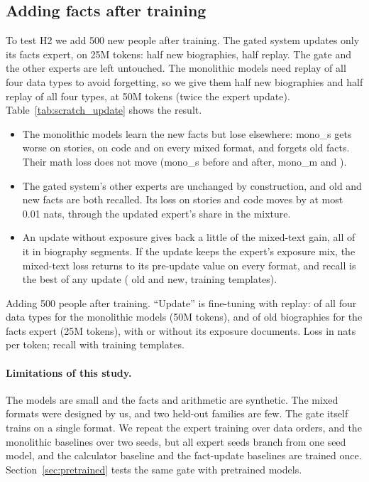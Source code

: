 \documentclass[10pt]{article}
\newcommand{\pending}[1]{{\color{red}\textbf{[#1]}}}
\begin{document}
\subsection{Adding facts after training}
\label{sec:scratch_update}

To test H2 we add 500 new people after training. The gated system updates only its facts
expert, on 25M tokens: half new biographies, half replay. The gate and the other experts are left
untouched. The monolithic models need replay of all four data types to avoid forgetting, so we
give them half new biographies and half replay of all four types, at 50M tokens (twice the
expert update). Table~\ref{tab:scratch_update} shows the result.
\begin{itemize}
\item The monolithic models learn the new facts but lose elsewhere: mono\_s gets worse
on stories, on code and on every mixed format, and forgets old facts. Their math loss does not
move (mono\_s \resTrackCUpdMonoSMathBefore{} before and \resTrackCUpdMonoSMathAfter{} after,
mono\_m \resTrackCUpdMonoMMathBefore{} and \resTrackCUpdMonoMMathAfter{}).
\item The gated system's other experts are unchanged by construction, and old and new facts are
both recalled. Its loss on stories and code moves by at most 0.01 nats, through the updated
expert's share in the mixture.
\item An update without exposure gives back a little of the mixed-text gain, all of it in
biography segments. If the update keeps the expert's exposure mix, the mixed-text loss returns
to its pre-update value on every format, and recall is the best of any update
(\resTrackCUpdOldRecall{} old and \resTrackCUpdNewRecall{} new, training templates).
\end{itemize}
\begin{table}[t]
\centering\small
\caption{Adding 500 people after training. ``Update'' is fine-tuning with replay: of all four
data types for the monolithic models (50M tokens), and of old biographies for the facts expert
(25M tokens), with or without its exposure documents. Loss in nats per token; recall with
training templates.}
\label{tab:scratch_update}
{\setlength{\tabcolsep}{4pt}\IfFileExists{tables/track_c_update.tex}{}{\pending{table}}}
\end{table}

\paragraph{Limitations of this study.} The models are small and the facts and arithmetic are
synthetic. The mixed formats were designed by us, and two held-out families are few. The gate
itself trains on a single format. We repeat the expert training over \resTrackCExpertSeeds{} data
orders, and the monolithic baselines over two seeds, but all expert seeds branch from one seed model,
and the calculator baseline and the fact-update baselines are trained once.
Section~\ref{sec:pretrained} tests the same gate with pretrained models.
\end{document}
